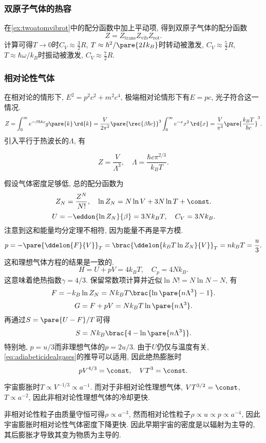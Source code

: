 \documentclass[../Thermal.tex]{subfiles}
\begin{document}
\subsubsection{双原子气体的热容}
在\cref{ex:twoatomvibrot}中的配分函数中加上平动项, 得到双原子气体的配分函数
\[ Z = Z_{\mathrm{trans}}Z_{\mathrm{vib}}Z_{\mathrm{rot}}. \]
计算可得$T\rightarrow 0$时$C_V\approx \frac{3}{2}R$, $T\approx \hbar^2/\pare{2Ik_B}$时转动被激发, $C_V\approx\frac{5}{2}R$, $T\approx \hbar\omega/k_B$时振动被激发, $C_V\approx \frac{7}{2}R$.
\subsubsection{相对论性气体}
在相对论的情形下, $E^2 = p^2c^2 + m^2 c^4$, 极端相对论情形下有$E=pc$, 光子符合这一情况.
\[ Z = \int_0^\infty e^{-\beta \hbar kc}g\pare{k}\,\rd{k} = \frac{V}{2\pi^2}\pare{\rec{\beta\hbar c}}^3\int_0^\infty e^{-x}x^2\,\rd{x} = \frac{V}{\pi^2}\pare{\frac{k_B T}{\hbar c}}^3. \]
引入平行于热波长的$\Lambda$, 有
\begin{finale}
\[ Z = \frac{V}{\Lambda^3},\quad \Lambda = \frac{\hbar c\pi^{2/3}}{k_BT}. \]
\end{finale}
假设气体密度足够低, 总的配分函数为
\[ Z_N = \frac{Z^N}{N!},\quad \ln Z_N = N \ln V + 3N \ln T + \const. \]
\[ U = -\eddon{\ln Z_N}{\beta} = 3Nk_BT,\quad C_V = 3Nk_B. \]
注意到这和能量均分定理不相符, 因为能量不再是平方模.
\begin{equation}
\label{eq:pisu3}
p = -\pare{\ddelon{F}{V}}_T = \brac{\ddelon{k_BT\ln Z_N}{V}}_T = nk_BT = \frac{u}{3}.
\end{equation}
这和理想气体方程的结果是一致的.
\[ H = U + pV = 4k_BT,\quad C_p = 4Nk_B. \]
这意味着绝热指数$\gamma=4/3$. 保留常数项计算并近似$\ln N! = N\ln N - N$, 有
\[ F = -k_B\ln Z_N = Nk_BT\brac{\ln \pare{n\Lambda^3} - 1}. \]
\[ G = F + pV = Nk_BT\ln\pare{n\Lambda^3}. \]
再通过$S=\pare{U-F}/T$可得
\[ S = Nk_B\brac{4 - \ln\pare{n\Lambda^3}}. \]
特别地, $p=u/3$而非理想气体的$p=2u/3$. 由于$U$仍仅与温度有关, \eqref{eq:adiabeticidealgases}的推导可以适用, 因此绝热膨胀时
\[ pV^{4/3} = \const,\quad VT^3 = \const. \]
\begin{ex}
宇宙膨胀时$T\propto V^{-1/3} \propto a^{-1}$. 而对于非相对论性理想气体, $VT^{3/2}=\const$, $T\propto a^{-2}$, 因此非相对论性理想气体的冷却更快.
\end{ex}
\begin{ex}
非相对论性粒子由质量守恒可得$\rho \propto a^{-3}$, 然而相对论性粒子$\rho \propto u \propto p \propto a^{-4}$, 因此宇宙膨胀时相对论性气体密度下降更快. 因此早期宇宙的密度是以辐射为主导的, 其后膨胀才导致其变为物质为主导的.
\end{ex}
\end{document}
